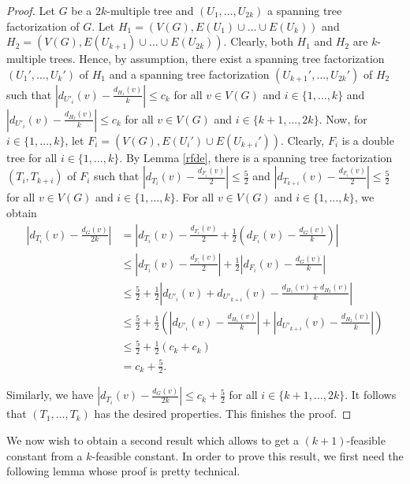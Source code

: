 \documentclass{article}
\theoremstyle{plain}
\theoremstyle{nonumberplain}
\theoremstyle{nonumberplain}
\newcommand{\stf}{spanning tree factorization }
\begin{document}
\begin{proof}
Let $G$ be a $2k$-multiple tree and $(U_1,\ldots,U_{2k})$ a \stf of $G$. Let $H_1=(V(G), E(U_1)\cup \ldots \cup E(U_k))$ and $H_2=(V(G), E(U_{k+1})\cup \ldots \cup E(U_{2k}))$. Clearly, both $H_1$ and $H_2$ are $k$-multiple trees. Hence, by assumption, there exist a spanning tree factorization $(U_1',\ldots,U_k')$ of $H_1$ and a \stf $(U_{k+1}',\ldots,U_{2k}')$ of $H_2$ such that $|d_{U'_i}(v)-\frac{d_{H_1}(v)}{k}| \leq c_k$ for all $v \in V(G)$ and $i \in \{1,\ldots,k\}$ and $|d_{U'_i}(v)-\frac{d_{H_2}(v)}{k}| \leq c_k$ for all $v \in V(G)$ and $i \in \{k+1,\ldots,2k\}$. Now, for $i \in \{1,\ldots,k\}$, let $F_i=(V(G),E(U_i')\cup E(U_{k+i}'))$. Clearly, $F_i$ is a double tree for all $i \in \{1,\ldots,k\}$. By Lemma \ref{rfde}, there is a spanning tree factorization $(T_i,T_{k+i})$ of $F_i$ such that $|d_{T_i}(v)-\frac{d_{F_i}(v)}{2}| \leq \frac{5}{2}$ and $|d_{T_{k+i}}(v)-\frac{d_{F_i}(v)}{2}| \leq \frac{5}{2}$ for all  $v \in V(G)$ and $i \in \{1,\ldots,k\}$. For all $v \in V(G)$ and $i \in \{1,\ldots,k\}$, we obtain 
\begin{align*}|d_{T_i}(v)-\frac{d_{G}(v)}{2k}| &= |d_{T_i}(v)-\frac{d_{F_i}(v)}{2}+\frac{1}{2}(d_{F_i}(v)-\frac{d_{G}(v)}{k})|\\
&\leq |d_{T_i}(v)-\frac{d_{F_i}(v)}{2}|+\frac{1}{2}|d_{F_i}(v)-\frac{d_{G}(v)}{k}|\\
&\leq \frac{5}{2}+\frac{1}{2}|d_{U'_i}(v)+d_{U'_{k+i}}(v)-\frac{d_{H_1}(v)+d_{H_2}(v)}{k}|\\
&\leq \frac{5}{2}+\frac{1}{2}(|d_{U'_i}(v)-\frac{d_{H_1}(v)}{k}|+|d_{U'_{k+i}}(v)-\frac{d_{H_2}(v)}{k}|)\\
&\leq \frac{5}{2}+\frac{1}{2}(c_k+c_k)\\
&=c_k+\frac{5}{2}.
\end{align*}

Similarly, we have $|d_{T_i}(v)-\frac{d_{G}(v)}{2k}|\leq c_k+\frac{5}{2}$ for all $i \in \{k+1,\ldots,2k\}$. It follows that $(T_1,\ldots,T_k)$ has the desired properties. This finishes the proof.
\end{proof}
We now wish to obtain a second result which allows to get a $(k+1)$-feasible constant from a $k$-feasible constant. In order to prove this result, we first need the following lemma whose proof is pretty technical.
\end{document}
